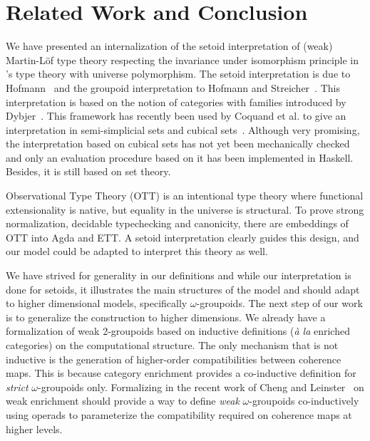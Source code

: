 
\section{Related Work and Conclusion}
\label{sec:conclusion}

We have presented an internalization of the setoid interpretation of
(weak) Martin-Löf type theory respecting the invariance under
isomorphism principle in \Coq's type theory with universe polymorphism.
%
The setoid interpretation is due to Hofmann~\cite{hofmann95These} and the groupoid
interpretation to Hofmann and Streicher~\cite{groupoid-interp}. This
interpretation is based on the notion of categories with families
introduced by Dybjer~\cite{dybjer:internaltt}.
%
This framework has recently been used by Coquand et al. to give an
interpretation in semi-simplicial sets and cubical
sets~\cite{barras:_gener_takeut_gandy_inter,coquand:cubical}.
%
Although very promising, the interpretation based on cubical sets has not
yet been mechanically checked and only an evaluation procedure based on
it has been implemented in Haskell. Besides, it is still based on set theory.

Observational Type Theory (OTT)
\cite{altenkirch-mcbride-wierstra:ott-now} is an intentional type theory
where functional extensionality is native, but equality in the universe
is structural.
%
To prove strong normalization, decidable typechecking and canonicity,
there are embeddings of OTT into Agda and ETT. A setoid interpretation
clearly guides this design, and our model could be adapted to interpret
this theory as well.

We have strived for generality in our definitions and while our
interpretation is done for setoids, it illustrates the main structures
of the model and should adapt to higher dimensional models, specifically
$\omega$-groupoids.
%
The next step of our work is to generalize the construction to higher
dimensions. We already have a formalization of weak 2-groupoids based
on inductive definitions (\emph{à la} enriched categories) on the
computational structure.
%
The only mechanism that is not inductive is the generation of
higher-order compatibilities between coherence maps. 
%
This is because category enrichment provides a co-inductive definition
for \emph{strict} $\omega$-groupoids only. Formalizing in \Coq the recent work
of Cheng and Leinster~\cite{cheng2012weak} on weak enrichment should
provide a way to define \emph{weak} $\omega$-groupoids co-inductively using
operads to parameterize the compatibility required on coherence maps at
higher levels.
  

